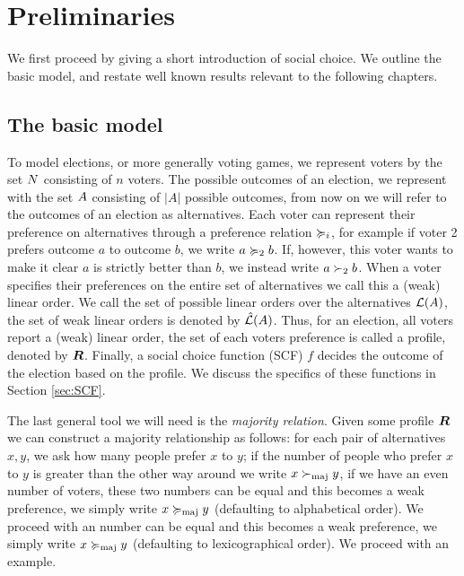 \chapter{Preliminaries}
\label{chap: preliminaries}
We first proceed by giving a short introduction of social choice. We outline the basic model, and restate well known results relevant to the following chapters.

\section{The basic model}

To model elections, or more generally voting games,
we represent voters by the set $N$ consisting of $n$ voters. The possible
outcomes of an election, we represent with the set $A$ consisting
of $|A|$ possible outcomes, from now on we will refer to the outcomes of an
election as alternatives. Each voter can represent their preference on
alternatives through a preference relation $\succcurlyeq_i$, for example if voter 2
prefers outcome $a$ to outcome $b$, we write $a \succcurlyeq_2 b$. If, however, this
voter wants to make it clear $a$ is strictly better than $b$, we instead write
$a \succ_2 b$. When a voter specifies their preferences on the entire set of
alternatives we call this a (weak) linear order. We call the set of possible
linear orders over the alternatives $\mathcal{L}(A)$, the set of weak
linear orders is denoted by $\hat{\mathcal{L}}(A)$. Thus, for an election, all
voters report a (weak) linear order, the set of each voters preference is
called a profile, denoted by $\boldsymbol{R}$. Finally, a social choice
function (SCF) $f$ decides the outcome of the election based on the profile. We
discuss the specifics of these functions in Section \cref{sec:SCF}.

The last general tool we will need is the \emph{majority relation}. Given some
profile $\boldsymbol{R}$ we can construct a majority relationship as follows:
for each pair of alternatives $x,y$, we ask how many people prefer $x$ to $y$;
if the number of people who prefer $x$ to $y$ is greater than the other way
around we write $x  \succ_{\textnormal{maj}} y$, if we have an even number of voters, these two
numbers can be equal and this becomes a weak preference, we simply write $x
	\succcurlyeq_{\textnormal{maj}} y$ (defaulting to alphabetical order). We proceed with an
number can be equal and this becomes a weak preference, we simply write $x
	\succcurlyeq_{\textnormal{maj}} y$ (defaulting to lexicographical order). We proceed with an
example.

